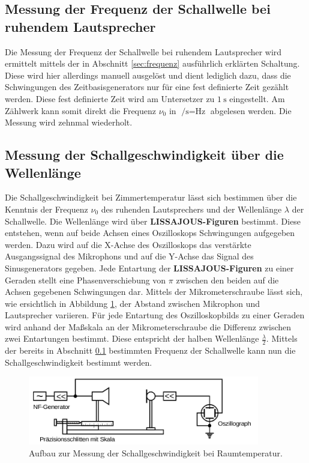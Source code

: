 \subsection{Messung der Frequenz der Schallwelle bei ruhendem Lautsprecher}
\label{sec:schall} %
Die Messung der Frequenz der Schallwelle bei ruhendem Lautsprecher wird ermittelt mittels der in Abschnitt \ref{sec:frequenz} ausführlich erklärten Schaltung.
Diese wird hier allerdings manuell ausgelöst und dient lediglich dazu, dass die Schwingungen des Zeitbasisgenerators nur für eine fest definierte Zeit gezählt werden.
Diese fest definierte Zeit wird am Untersetzer zu $\SI{1}{\second}$ eingestellt. Am Zählwerk kann somit direkt die Frequenz $\nu_{\mathrm{0}}$ in $\si{\per\second}=\si{\Hz}$ abgelesen werden.
Die Messung wird zehnmal wiederholt.
\subsection{Messung der Schallgeschwindigkeit über die Wellenlänge}
Die Schallgeschwindigkeit bei Zimmertemperatur lässt sich bestimmen über die Kenntnis der Frequenz $\nu_{\mathrm{0}}$ des ruhenden Lautsprechers und der Wellenlänge $\lambda$ der Schallwelle.
Die Wellenlänge wird über \textbf{LISSAJOUS-Figuren} bestimmt.
Diese entstehen, wenn auf beide Achsen eines Oszilloskops Schwingungen aufgegeben werden. Dazu wird auf die X-Achse des Oszilloskops das verstärkte Ausgangssignal des Mikrophons und auf die Y-Achse das Signal des Sinusgenerators gegeben.
Jede Entartung der \textbf{LISSAJOUS-Figuren} zu einer Geraden stellt eine Phasenverschiebung von $\pi$ zwischen den beiden auf die Achsen gegebenen Schwingungen dar.
Mittels der Mikrometerschraube lässt sich, wie ersichtlich in Abbildung \ref{fig:lisa}, der Abstand zwischen Mikrophon und Lautsprecher variieren.
Für jede Entartung des Oszilloskopbilds zu einer Geraden wird anhand
der Maßskala an der Mikrometerschraube die Differenz zwischen zwei Entartungen bestimmt. Diese entspricht der halben Wellenlänge $\frac{\lambda}{2}$.
Mittels der bereits in Abschnitt \ref{sec:schall} bestimmten Frequenz der Schallwelle kann nun die Schallgeschwindigkeit bestimmt werden.

\begin{figure}
	\includegraphics[width=0.9\textwidth]{Bilder/lissajou.png}
	\caption{Aufbau zur Messung der Schallgeschwindigkeit bei Raumtemperatur. \cite{Anleitung}}
	\label{fig:lisa}
\end{figure}


